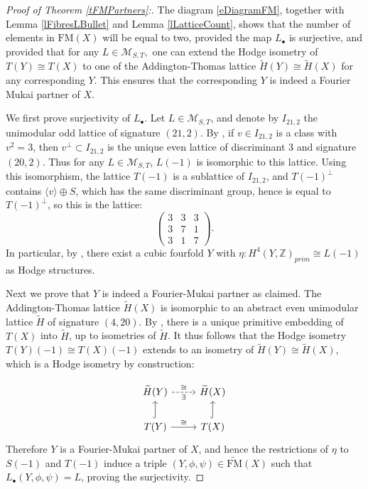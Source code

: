 \documentclass[11pt]{amsart}
\theoremstyle{plain}
\numberwithin{equation}{section}
\theoremstyle{definition}
\theoremstyle{remark}
\newcommand{\bZ}{\mathbb{Z}}
\newcommand{\calM}{\mathcal{M}}
\begin{document}
\begin{proof}[Proof of Theorem \ref{tFMPartners}:]
The diagram \ref{eDiagramFM}, together with Lemma \ref{lFibresLBullet} and Lemma \ref{lLatticeCount}, shows that the number of elements in $\mathrm{FM}(X)$ will be equal to two, provided the map $L_\bullet$ is surjective, and provided that for any $L\in\mathcal{M}_{S,T},$ one can extend the Hodge isometry of $T(Y)\cong T(X)$ to one of the Addington-Thomas lattice $\widetilde{H}(Y)\cong \widetilde{H}(X)$ for any corresponding $Y$. This ensures that the corresponding $Y$ is indeed a Fourier Mukai partner of $X$.

We first prove surjectivity of $L_\bullet$. Let $L\in \calM_{S,T}$, and denote by $I_{21,2}$ the unimodular odd lattice of signature $(21,2)$. By \cite[Cor. 1.13.3]{nikulin}, if $v\in I_{21,2}$ is a class with $v^2=3$, then $v^{\perp} \subset I_{21,2} $ is the unique even lattice of discriminant $3$ and signature $(20,2)$. Thus for any $L\in \mathcal{M}_{S, T}$, $L(-1)$ is isomorphic to this lattice. 
 Using this isomorphism, the lattice $T(-1)$ is a sublattice of $I_{21,2}$, and $T(-1)^\perp$ contains $\langle v \rangle \oplus S$, which has the same discriminant group, hence is equal to $T(-1)^\perp$, so this is the lattice:
$$\left(\begin{matrix}
    3 & 3& 3\\
    3 & 7 & 1\\
    3 & 1 & 7
\end{matrix}\right).$$ In particular, by \cite[Theorem 1.1]{laz09}, there exist a cubic fourfold $Y$ with $\eta:H^4(Y,\bZ)_{prim}\cong L(-1)$ as Hodge structures. 

Next we prove that $Y$ is indeed a Fourier-Mukai partner as claimed. The Addington-Thomas lattice $\widetilde{H}(X)$ is isomorphic to an abstract even unimodular lattice $\widetilde{H}$ of signature $(4,20).$ By \cite[1.14.4]{nikulin}, there is a unique primitive embedding of $T(X)$ into $\widetilde{H}$, up to isometries of $\widetilde{H}$. It thus follows that the Hodge isometry $T(Y)(-1)\cong T(X)(-1)$ extends to an isometry of $\widetilde{H}(Y)\cong \widetilde{H}(X)$, which is a Hodge isometry by construction:

\begin{equation}\label{eDiagramFM}
\begin{tikzcd}
    \widetilde{H}(Y) \arrow[r, "\cong", dashed, "{\exists}"' {below}] & \widetilde{H}(X)\\
    T(Y) \arrow[u, hookrightarrow] \arrow[r, "\cong"]& T(X) \arrow[u, hookrightarrow]
\end{tikzcd}
\end{equation}
 Therefore $Y$ is a Fourier-Mukai partner of $X$, and hence the restrictions of $\eta$ to $S(-1)$ and $T(-1)$ induce a triple $(Y,\phi,\psi ) \in \widetilde{\mathrm{FM}}(X)$ such that $L_\bullet(Y, \phi,\psi)=L$, proving the surjectivity. 
\end{proof}
\end{document}
